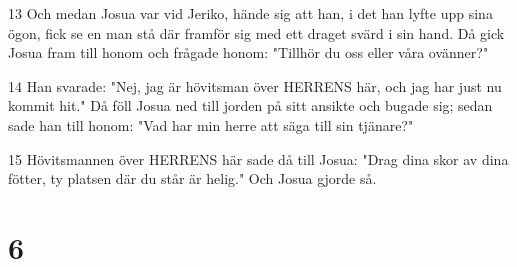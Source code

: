 \par 13 Och medan Josua var vid Jeriko, hände sig att han, i det han lyfte upp sina ögon, fick se en man stå där framför sig med ett draget svärd i sin hand. Då gick Josua fram till honom och frågade honom: "Tillhör du oss eller våra ovänner?"
\par 14 Han svarade: "Nej, jag är hövitsman över HERRENS här, och jag har just nu kommit hit." Då föll Josua ned till jorden på sitt ansikte och bugade sig; sedan sade han till honom: "Vad har min herre att säga till sin tjänare?"
\par 15 Hövitsmannen över HERRENS här sade då till Josua: "Drag dina skor av dina fötter, ty platsen där du står är helig." Och Josua gjorde så.

\chapter{6}

